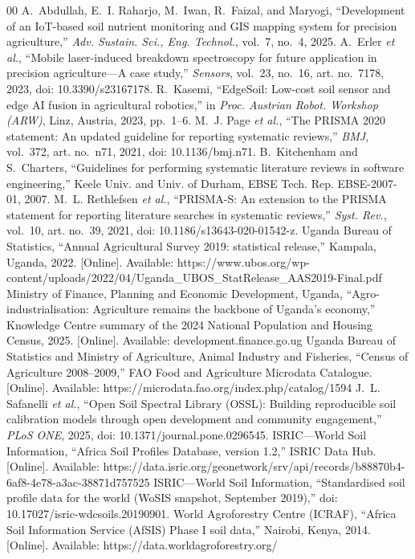 \documentclass[conference]{IEEEtran}
\begin{document}
\begin{thebibliography}{00}
 A.~Abdullah, E.~I. Raharjo, M.~Iwan, R.~Faizal, and Maryogi, ``Development of an IoT-based soil nutrient monitoring and GIS mapping system for precision agriculture,'' \emph{Adv. Sustain. Sci., Eng. Technol.}, vol.~7, no.~4, 2025.
 A.~Erler \emph{et al.}, ``Mobile laser-induced breakdown spectroscopy for future application in precision agriculture---A case study,'' \emph{Sensors}, vol.~23, no.~16, art. no.~7178, 2023, doi: 10.3390/s23167178.
 R.~Kasemi, ``EdgeSoil: Low-cost soil sensor and edge AI fusion in agricultural robotics,'' in \emph{Proc. Austrian Robot. Workshop (ARW)}, Linz, Austria, 2023, pp.~1--6.
 M.~J. Page \emph{et al.}, ``The PRISMA 2020 statement: An updated guideline for reporting systematic reviews,'' \emph{BMJ}, vol.~372, art. no.~n71, 2021, doi: 10.1136/bmj.n71.
 B.~Kitchenham and S.~Charters, ``Guidelines for performing systematic literature reviews in software engineering,'' Keele Univ. and Univ. of Durham, EBSE Tech. Rep. EBSE-2007-01, 2007.
 M.~L. Rethlefsen \emph{et al.}, ``PRISMA-S: An extension to the PRISMA statement for reporting literature searches in systematic reviews,'' \emph{Syst. Rev.}, vol.~10, art. no.~39, 2021, doi: 10.1186/s13643-020-01542-z.
 Uganda Bureau of Statistics, ``Annual Agricultural Survey 2019: statistical release,'' Kampala, Uganda, 2022. [Online]. Available: https://www.ubos.org/wp-content/uploads/2022/04/Uganda\_UBOS\_StatRelease\_AAS2019-Final.pdf
 Ministry of Finance, Planning and Economic Development, Uganda, ``Agro-industrialisation: Agriculture remains the backbone of Uganda's economy,'' Knowledge Centre summary of the 2024 National Population and Housing Census, 2025. [Online]. Available: development.finance.go.ug
 Uganda Bureau of Statistics and Ministry of Agriculture, Animal Industry and Fisheries, ``Census of Agriculture 2008--2009,'' FAO Food and Agriculture Microdata Catalogue. [Online]. Available: https://microdata.fao.org/index.php/catalog/1594
 J.~L. Safanelli \emph{et al.}, ``Open Soil Spectral Library (OSSL): Building reproducible soil calibration models through open development and community engagement,'' \emph{PLoS ONE}, 2025, doi: 10.1371/journal.pone.0296545.
 ISRIC---World Soil Information, ``Africa Soil Profiles Database, version 1.2,'' ISRIC Data Hub. [Online]. Available: https://data.isric.org/geonetwork/srv/api/records/b88870b4-6af8-4e78-a3ac-38871d757525
 ISRIC---World Soil Information, ``Standardised soil profile data for the world (WoSIS snapshot, September 2019),'' doi: 10.17027/isric-wdcsoils.20190901.
 World Agroforestry Centre (ICRAF), ``Africa Soil Information Service (AfSIS) Phase I soil data,'' Nairobi, Kenya, 2014. [Online]. Available: https://data.worldagroforestry.org/
\end{thebibliography}
\end{document}
